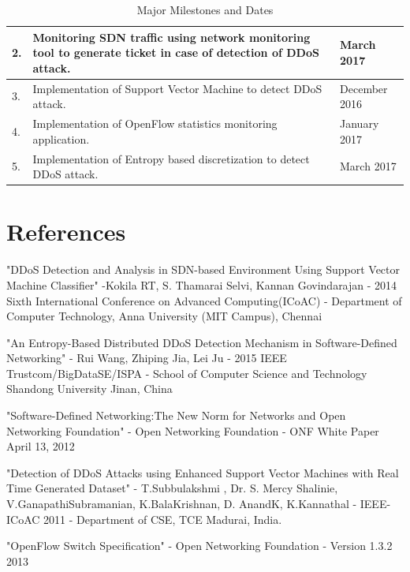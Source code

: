 \documentclass[12pt,a4paper,final]{article}
\begin{document}
\begin{flushleft}
\begin{table}[H]
\begin{tabular}{ | m{1cm} | m{9cm}| m{3cm} | }
2. &
Monitoring SDN traffic using network monitoring tool to generate ticket in case of detection of DDoS attack. &
March 2017 \\ 
\hline

3. & 
Implementation of Support Vector Machine to detect DDoS attack. &
December 2016 \\
\hline

4. & 
Implementation of OpenFlow statistics monitoring application. &
January 2017 \\
\hline

5. & 
Implementation of Entropy based discretization to detect DDoS attack. &
March 2017 \\
\hline
\end{tabular}
\caption{Major Milestones and Dates}
\end{table}

\noindent
\section{References}
\begin{enumerate}[label={[\arabic*]}]
\item 
"DDoS Detection and Analysis in SDN-based Environment Using Support Vector Machine Classifier" -Kokila RT, S. Thamarai Selvi, Kannan Govindarajan - 2014 Sixth International Conference on Advanced Computing(ICoAC) - Department of Computer Technology, Anna University (MIT Campus), Chennai

\item 
"An Entropy-Based Distributed DDoS Detection Mechanism in Software-Defined Networking" - Rui Wang, Zhiping Jia, Lei Ju - 2015 IEEE Trustcom/BigDataSE/ISPA - School of Computer Science and Technology Shandong University Jinan, China

\item 
"Software-Defined Networking:The New Norm for Networks and 
Open Networking Foundation" - Open Networking Foundation - ONF White Paper April 13, 2012

\item 
"Detection of DDoS Attacks using Enhanced Support Vector Machines with Real Time Generated Dataset" - T.Subbulakshmi , Dr. S. Mercy Shalinie, V.GanapathiSubramanian, K.BalaKrishnan, D. AnandK, K.Kannathal - IEEE-ICoAC 2011 - Department of CSE, TCE Madurai, India.

\item
"OpenFlow Switch Specification" - Open Networking Foundation - Version 1.3.2 2013
\end{enumerate}
\end{flushleft}
\end{document}

